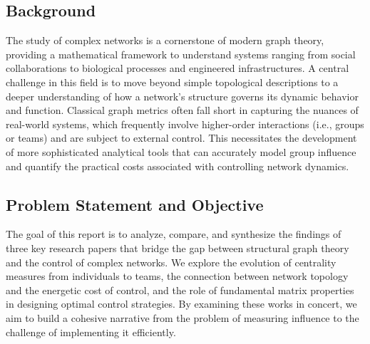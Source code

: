 \documentclass[10pt, a4paper]{article}
\begin{document}
\subsection*{Background}
The study of complex networks is a cornerstone of modern graph theory, providing a mathematical framework to understand systems ranging from social collaborations to biological processes and engineered infrastructures. A central challenge in this field is to move beyond simple topological descriptions to a deeper understanding of how a network's structure governs its dynamic behavior and function. Classical graph metrics often fall short in capturing the nuances of real-world systems, which frequently involve higher-order interactions (i.e., groups or teams) and are subject to external control. This necessitates the development of more sophisticated analytical tools that can accurately model group influence and quantify the practical costs associated with controlling network dynamics.

\subsection*{Problem Statement and Objective}
The goal of this report is to analyze, compare, and synthesize the findings of three key research papers that bridge the gap between structural graph theory and the control of complex networks. We explore the evolution of centrality measures from individuals to teams, the connection between network topology and the energetic cost of control, and the role of fundamental matrix properties in designing optimal control strategies. By examining these works in concert, we aim to build a cohesive narrative from the problem of measuring influence to the challenge of implementing it efficiently.
\end{document}
